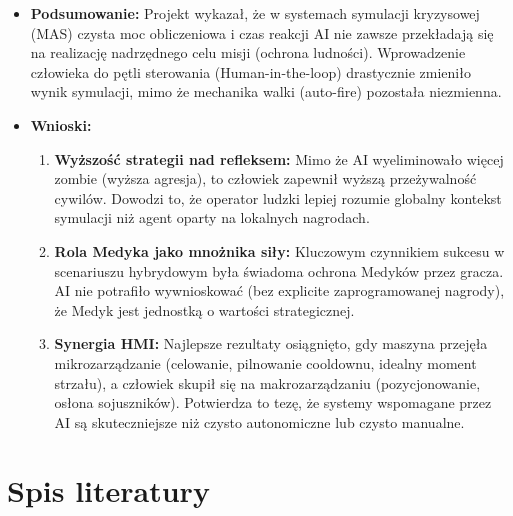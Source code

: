 \documentclass[12pt,a4paper]{article}
\begin{document}
\begin{itemize}
    \item \textbf{Podsumowanie:}
          Projekt wykazał, że w systemach symulacji kryzysowej (MAS) czysta moc obliczeniowa i czas reakcji AI nie zawsze przekładają się na realizację nadrzędnego celu misji (ochrona ludności). Wprowadzenie człowieka do pętli sterowania (Human-in-the-loop) drastycznie zmieniło wynik symulacji, mimo że mechanika walki (auto-fire) pozostała niezmienna.

    \item \textbf{Wnioski:}
          \begin{enumerate}
              \item \textbf{Wyższość strategii nad refleksem:} Mimo że AI wyeliminowało więcej zombie (wyższa agresja), to człowiek zapewnił wyższą przeżywalność cywilów. Dowodzi to, że operator ludzki lepiej rozumie globalny kontekst symulacji niż agent oparty na lokalnych nagrodach.
              \item \textbf{Rola Medyka jako mnożnika siły:} Kluczowym czynnikiem sukcesu w scenariuszu hybrydowym była świadoma ochrona Medyków przez gracza. AI nie potrafiło wywnioskować (bez explicite zaprogramowanej nagrody), że Medyk jest jednostką o wartości strategicznej.
              \item \textbf{Synergia HMI:} Najlepsze rezultaty osiągnięto, gdy maszyna przejęła mikrozarządzanie (celowanie, pilnowanie cooldownu, idealny moment strzału), a człowiek skupił się na makrozarządzaniu (pozycjonowanie, osłona sojuszników). Potwierdza to tezę, że systemy wspomagane przez AI są skuteczniejsze niż czysto autonomiczne lub czysto manualne.
          \end{enumerate}
\end{itemize}

\newpage
\section{Spis literatury}

\printbibliography[heading=none]
\end{document}

